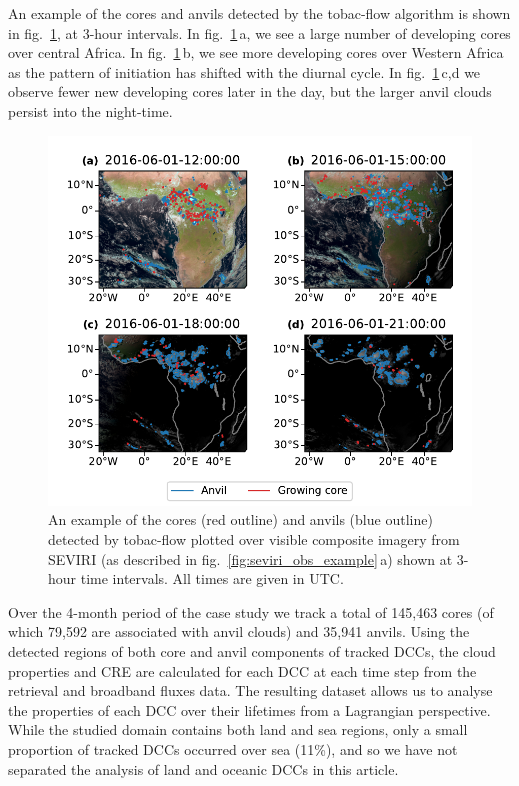\documentclass[acp, manuscript]{copernicus}
\begin{document}
An example of the cores and anvils detected by the tobac-flow algorithm is shown in fig.~\ref{fig:seviri_detection}, at 3-hour intervals. In fig.~\ref{fig:seviri_detection}\,a, we see a large number of developing cores over central Africa. 
In fig.~\ref{fig:seviri_detection}\,b, we see more developing cores over Western Africa as the pattern of initiation has shifted with the diurnal cycle.
In fig.~\ref{fig:seviri_detection}\,c,d we observe fewer new developing cores later in the day, but the larger anvil clouds persist into the night-time.


\begin{figure}[tp]
    \includegraphics[width=12cm]{figures/fig04.pdf}
    \caption[
    An example of the cores and anvils (detected by tobac-flow, shown at 3-hour time intervals
    ]{
    An example of the cores (red outline) and anvils (blue outline) detected by tobac-flow plotted over visible composite imagery from SEVIRI (as described in fig.~\ref{fig:seviri_obs_example}\,a) shown at 3-hour time intervals. All times are given in UTC.
    }
    \label{fig:seviri_detection}
\end{figure}


Over the 4-month period of the case study we track a total of 145,463 cores (of which 79,592 are associated with anvil clouds) and 35,941 anvils. 
Using the detected regions of both core and anvil components of tracked DCCs, the cloud properties and CRE are calculated for each DCC at each time step from the retrieval and broadband fluxes data. 
The resulting dataset allows us to analyse the properties of each DCC over their lifetimes from a Lagrangian perspective.
While the studied domain contains both land and sea regions, only a small proportion of tracked DCCs occurred over sea (11\%), and so we have not separated the analysis of land and oceanic DCCs in this article.
\end{document}
